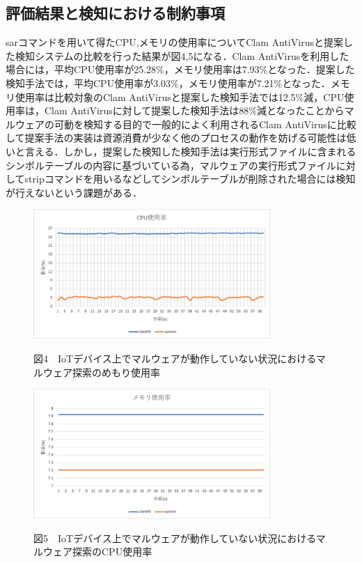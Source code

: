 \subsection{評価結果と検知における制約事項}
sarコマンドを用いて得たCPU,メモリの使用率についてClam AntiVirusと提案した検知システムの比較を行った結果が図4,5になる．Clam AntiVirusを利用した場合には，平均CPU使用率が25.28\%，メモリ使用率は7.93\%となった．提案した検知手法では，平均CPU使用率が3.03\%，メモリ使用率が7.21\%となった．メモリ使用率は比較対象のClam AntiVirusと提案した検知手法では12.5\%減，CPU使用率は，Clam AntiVirusに対して提案した検知手法は88\%減となったことからマルウェアの可動を検知する目的で一般的によく利用されるClam AntiVirusに比較して提案手法の実装は資源消費が少なく他のプロセスの動作を妨げる可能性は低いと言える．しかし，提案した検知した検知手法は実行形式ファイルに含まれるシンボルテーブルの内容に基づいている為，マルウェアの実行形式ファイルに対してstripコマンドを用いるなどしてシンボルテーブルが削除された場合には検知が行えないという課題がある．

\begin{figure}[h]
 \centering
    \includegraphics[width=90mm]{figures/CPU.eps}
 \label{fig:model}
 \begin{center}図4　IoTデバイス上でマルウェアが動作していない状況におけるマルウェア探索のめもり使用率\end{center}
 \end{figure}\begin{figure}[h]
 \centering
    \includegraphics[width=90mm]{figures/mem.eps}
 \label{fig:model}
 \begin{center}図5　IoTデバイス上でマルウェアが動作していない状況におけるマルウェア探索のCPU使用率\end{center}
 \end{figure}
